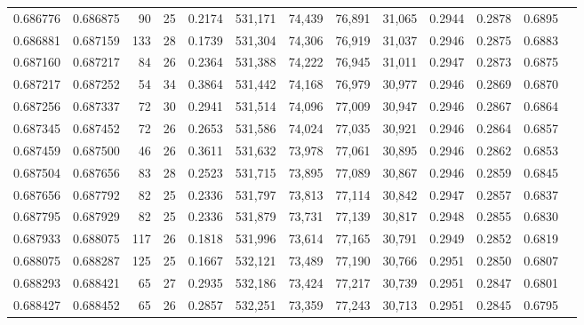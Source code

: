 \begin{tabular}{rrrrrrrrrrrrr}
0.686776 & 0.686875 &    90 &  25 &                                     0.2174 & 531,171 &  74,439 &  76,891 &  31,065 & 0.2944 & 0.2878 & 0.6895 \\
0.686881 & 0.687159 &   133 &  28 &                                     0.1739 & 531,304 &  74,306 &  76,919 &  31,037 & 0.2946 & 0.2875 & 0.6883 \\
0.687160 & 0.687217 &    84 &  26 &                                     0.2364 & 531,388 &  74,222 &  76,945 &  31,011 & 0.2947 & 0.2873 & 0.6875 \\
0.687217 & 0.687252 &    54 &  34 &                                     0.3864 & 531,442 &  74,168 &  76,979 &  30,977 & 0.2946 & 0.2869 & 0.6870 \\
0.687256 & 0.687337 &    72 &  30 &                                     0.2941 & 531,514 &  74,096 &  77,009 &  30,947 & 0.2946 & 0.2867 & 0.6864 \\
0.687345 & 0.687452 &    72 &  26 &                                     0.2653 & 531,586 &  74,024 &  77,035 &  30,921 & 0.2946 & 0.2864 & 0.6857 \\
0.687459 & 0.687500 &    46 &  26 &                                     0.3611 & 531,632 &  73,978 &  77,061 &  30,895 & 0.2946 & 0.2862 & 0.6853 \\
0.687504 & 0.687656 &    83 &  28 &                                     0.2523 & 531,715 &  73,895 &  77,089 &  30,867 & 0.2946 & 0.2859 & 0.6845 \\
0.687656 & 0.687792 &    82 &  25 &                                     0.2336 & 531,797 &  73,813 &  77,114 &  30,842 & 0.2947 & 0.2857 & 0.6837 \\
0.687795 & 0.687929 &    82 &  25 &                                     0.2336 & 531,879 &  73,731 &  77,139 &  30,817 & 0.2948 & 0.2855 & 0.6830 \\
0.687933 & 0.688075 &   117 &  26 &                                     0.1818 & 531,996 &  73,614 &  77,165 &  30,791 & 0.2949 & 0.2852 & 0.6819 \\
0.688075 & 0.688287 &   125 &  25 &                                     0.1667 & 532,121 &  73,489 &  77,190 &  30,766 & 0.2951 & 0.2850 & 0.6807 \\
0.688293 & 0.688421 &    65 &  27 &                                     0.2935 & 532,186 &  73,424 &  77,217 &  30,739 & 0.2951 & 0.2847 & 0.6801 \\
0.688427 & 0.688452 &    65 &  26 &                                     0.2857 & 532,251 &  73,359 &  77,243 &  30,713 & 0.2951 & 0.2845 & 0.6795 \\

\end{tabular}
